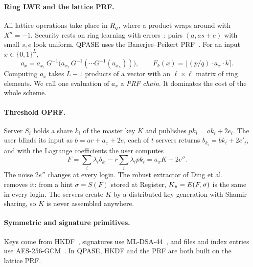 \paragraph{Ring LWE and the lattice PRF.} All lattice operations take place in $R_q$, where a product wraps around
with $X^n = -1$. Security rests on ring learning with errors~\cite{regev2009lwe,lyubashevsky2010ring}: pairs
$(a, as + e)$ with small $s, e$ look uniform. QPASE uses the Banerjee--Peikert PRF~\cite{banerjee2014prf}. For an
input $x \in \{0,1\}^L$,
\begin{equation}
a_x = a_{x_1} \, G^{-1}\!\big(a_{x_2} \, G^{-1}( \cdots G^{-1}(a_{x_L}))\big),
\qquad F_k(x) = \big\lfloor (p/q) \cdot a_x \cdot k \big\rceil .
\label{eq:bp-prf}
\end{equation}
Computing $a_x$ takes $L - 1$ products of a vector with an $\ell \times \ell$ matrix of ring elements. We call one
evaluation of $a_x$ a \emph{PRF chain}. It dominates the cost of the whole scheme.

\paragraph{Threshold OPRF.} Server $S_i$ holds a share $k_i$ of the master key $K$ and publishes $pk_i = ak_i +
2e_i$. The user blinds its input as $b = ar + a_x + 2e$, each of $t$ servers returns $b_{k_i} = bk_i + 2e'_i$, and
with the Lagrange coefficients the user computes
\begin{equation}
F = \sum_i \lambda_i b_{k_i} - r \sum_i \lambda_i pk_i = a_x K + 2e'' .
\label{eq:toprf-combine}
\end{equation}
The noise $2e''$ changes at every login. The robust extractor of Ding et al.~\cite{ding2012kex} removes it: from a
hint $\sigma = S(F)$ stored at Register, $K_u = E(F, \sigma)$ is the same in every login. The servers create $K$ by
a distributed key generation with Shamir sharing, so $K$ is never assembled anywhere.

\paragraph{Symmetric and signature primitives.} Keys come from HKDF~\cite{krawczyk2010hkdf}, signatures use
ML-DSA-44~\cite{fips204}, and files and index entries use AES-256-GCM~\cite{dworkin2007gcm}. In QPASE, HKDF and the
PRF are both built on the lattice PRF.

